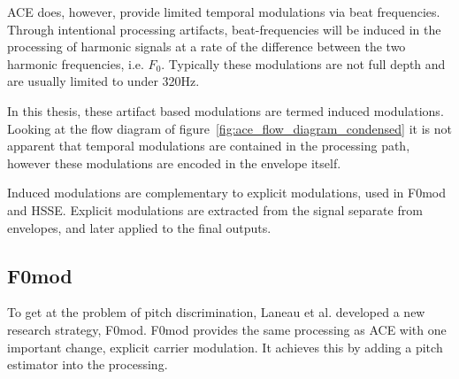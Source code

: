\documentclass [11pt, proquest,oneside] {ganter_thesis}[2015/03/03]
\begin{document}



ACE does, however, provide limited temporal modulations via beat frequencies.  Through intentional processing artifacts, beat-frequencies will be induced in the processing of harmonic signals at a rate of the difference between the two harmonic frequencies, i.e. $F_0$.  Typically these modulations are not full depth and are usually limited to under 320Hz.

In this thesis, these artifact based modulations are termed induced modulations.  Looking at the flow diagram of figure~\ref{fig:ace_flow_diagram_condensed} it is not apparent that temporal modulations are contained in the processing path, however these modulations are encoded in the envelope itself.

Induced modulations are complementary to explicit modulations, used in F0mod and HSSE.  Explicit modulations are extracted from the signal separate from envelopes, and later applied to the final outputs.

\subsection{F0mod}

To get at the problem of pitch discrimination, Laneau et al. \cite{laneau2006improved} developed a new research strategy, F0mod.  F0mod provides the same processing as ACE with one important change, explicit carrier modulation.  It achieves this by adding a pitch estimator into the processing.
\end{document}
